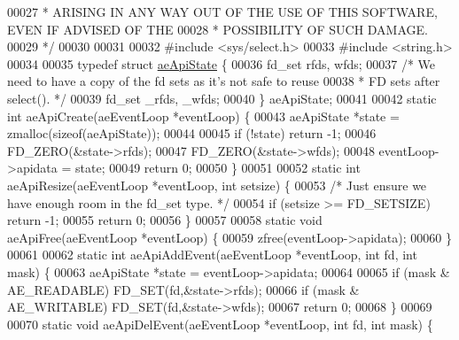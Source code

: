 \begin{DoxyCode}
00027 \textcolor{comment}{ * ARISING IN ANY WAY OUT OF THE USE OF THIS SOFTWARE, EVEN IF ADVISED OF THE}
00028 \textcolor{comment}{ * POSSIBILITY OF SUCH DAMAGE.}
00029 \textcolor{comment}{ */}
00030 
00031 
00032 \textcolor{preprocessor}{#}\textcolor{preprocessor}{include} \textcolor{preprocessor}{<}\textcolor{preprocessor}{sys}\textcolor{preprocessor}{/}\textcolor{preprocessor}{select}\textcolor{preprocessor}{.}\textcolor{preprocessor}{h}\textcolor{preprocessor}{>}
00033 \textcolor{preprocessor}{#}\textcolor{preprocessor}{include} \textcolor{preprocessor}{<}\textcolor{preprocessor}{string}\textcolor{preprocessor}{.}\textcolor{preprocessor}{h}\textcolor{preprocessor}{>}
00034 
00035 \textcolor{keyword}{typedef} \textcolor{keyword}{struct} \hyperlink{structaeApiState}{aeApiState} \{
00036     fd\_set rfds, wfds;
00037     \textcolor{comment}{/* We need to have a copy of the fd sets as it's not safe to reuse}
00038 \textcolor{comment}{     * FD sets after select(). */}
00039     fd\_set \_rfds, \_wfds;
00040 \} aeApiState;
00041 
00042 \textcolor{keyword}{static} \textcolor{keywordtype}{int} aeApiCreate(aeEventLoop *eventLoop) \{
00043     aeApiState *state = zmalloc(\textcolor{keyword}{sizeof}(aeApiState));
00044 
00045     \textcolor{keywordflow}{if} (!state) \textcolor{keywordflow}{return} -1;
00046     FD\_ZERO(&state->rfds);
00047     FD\_ZERO(&state->wfds);
00048     eventLoop->apidata = state;
00049     \textcolor{keywordflow}{return} 0;
00050 \}
00051 
00052 \textcolor{keyword}{static} \textcolor{keywordtype}{int} aeApiResize(aeEventLoop *eventLoop, \textcolor{keywordtype}{int} setsize) \{
00053     \textcolor{comment}{/* Just ensure we have enough room in the fd\_set type. */}
00054     \textcolor{keywordflow}{if} (setsize >= FD\_SETSIZE) \textcolor{keywordflow}{return} -1;
00055     \textcolor{keywordflow}{return} 0;
00056 \}
00057 
00058 \textcolor{keyword}{static} \textcolor{keywordtype}{void} aeApiFree(aeEventLoop *eventLoop) \{
00059     zfree(eventLoop->apidata);
00060 \}
00061 
00062 \textcolor{keyword}{static} \textcolor{keywordtype}{int} aeApiAddEvent(aeEventLoop *eventLoop, \textcolor{keywordtype}{int} fd, \textcolor{keywordtype}{int} mask) \{
00063     aeApiState *state = eventLoop->apidata;
00064 
00065     \textcolor{keywordflow}{if} (mask & AE\_READABLE) FD\_SET(fd,&state->rfds);
00066     \textcolor{keywordflow}{if} (mask & AE\_WRITABLE) FD\_SET(fd,&state->wfds);
00067     \textcolor{keywordflow}{return} 0;
00068 \}
00069 
00070 \textcolor{keyword}{static} \textcolor{keywordtype}{void} aeApiDelEvent(aeEventLoop *eventLoop, \textcolor{keywordtype}{int} fd, \textcolor{keywordtype}{int} mask) \{

\end{DoxyCode}
